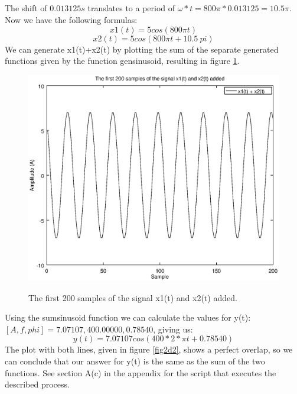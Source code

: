 \documentclass{article}
\begin{document}
\subsection{}
The shift of $0.013125s$ translates to a period of $\omega * t = 800\pi*0.013125 = 10.5\pi$. Now we have the following formulas:
\begin{equation}
    x1(t) = 5 cos(800\pi t)
\end{equation}
\begin{equation}
    x2(t) = 5 cos(800\pi t + 10.5\:pi)
\end{equation}
We can generate x1(t)+x2(t) by plotting the sum of the separate generated functions given by the function gensinusoid, resulting in figure \ref{fig2d1}.\\
\begin{figure}[H]
  \centering
  \includegraphics[width=.7\columnwidth]{plot4A.eps}\\
  \caption{The first 200 samples of the signal x1(t) and x2(t) added.}
  \label{fig2d1}
\end{figure}
Using the sumsinusoid function we can calculate the values for y(t):
$[A, f, phi] = 7.07107,400.00000,0.78540$, giving us:
\begin{equation}
    y(t) = 7.07107 cos(400*2*\pi t + 0.78540)
\end{equation}
The plot with both lines, given in figure \ref{fig2d2}, shows a perfect overlap, so we can conclude that our answer for y(t) is the same as the sum of the two functions. See section A(c) in the appendix for the script that executes the described process.
\end{document}
